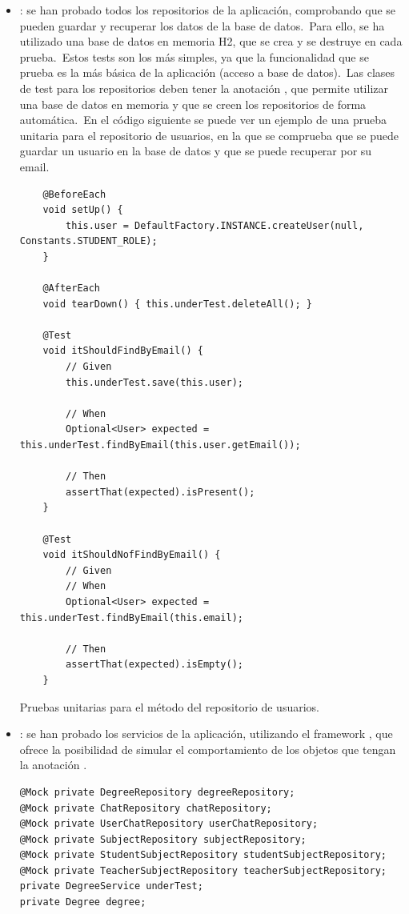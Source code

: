 \begin{itemize}
	\item {}: se han probado todos los repositorios de la aplicación, comprobando que se pueden
	guardar y recuperar los datos de la base de datos.\ Para ello, se ha utilizado una base de datos en memoria
	H2, que se crea y se destruye en cada prueba.\ Estos tests son los más simples, ya que la funcionalidad
	que se prueba es la más básica de la aplicación (acceso a base de datos).\ Las clases de test para los
	repositorios deben tener la anotación , que permite utilizar una base de datos en
	memoria y que se creen los repositorios de forma automática.\ En el código siguiente se puede
	ver un ejemplo de una prueba unitaria para el repositorio de usuarios, en la que se comprueba que se puede
	guardar un usuario en la base de datos y que se puede recuperar por su email.
	\begin{codeBlock}
		\begin{verbatim}
	@BeforeEach
	void setUp() {
		this.user = DefaultFactory.INSTANCE.createUser(null, Constants.STUDENT_ROLE);
	}

	@AfterEach
	void tearDown() { this.underTest.deleteAll(); }

	@Test
	void itShouldFindByEmail() {
		// Given
		this.underTest.save(this.user);

		// When
		Optional<User> expected = this.underTest.findByEmail(this.user.getEmail());

		// Then
		assertThat(expected).isPresent();
	}

	@Test
	void itShouldNofFindByEmail() {
		// Given
		// When
		Optional<User> expected = this.underTest.findByEmail(this.email);

		// Then
		assertThat(expected).isEmpty();
	}
		\end{verbatim}
		\caption{Pruebas unitarias para el método  del repositorio de usuarios.}
	\end{codeBlock}

	\item {}: se han probado los servicios de la aplicación, utilizando el framework
	, que ofrece la posibilidad de simular el comportamiento de los objetos que tengan la
	anotación .\
	\begin{codeBlock}
		\begin{verbatim}
@Mock private DegreeRepository degreeRepository;
@Mock private ChatRepository chatRepository;
@Mock private UserChatRepository userChatRepository;
@Mock private SubjectRepository subjectRepository;
@Mock private StudentSubjectRepository studentSubjectRepository;
@Mock private TeacherSubjectRepository teacherSubjectRepository;
private DegreeService underTest;
private Degree degree;


\end{verbatim}
\end{codeBlock}
\end{itemize}

